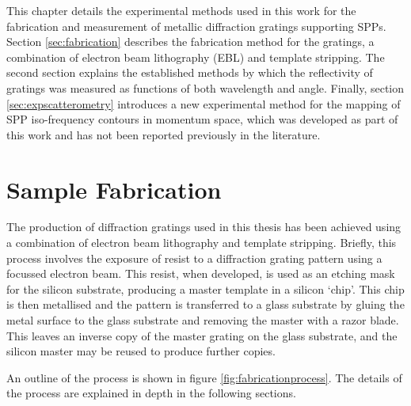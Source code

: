 

This chapter details the experimental methods used in this work for the fabrication and measurement of metallic diffraction gratings supporting SPPs. Section \ref{sec:fabrication} describes the fabrication method for the gratings, a combination of electron beam lithography (EBL) and template stripping. The second section explains the established methods by which the reflectivity of gratings was measured as functions of both wavelength and angle. Finally, section \ref{sec:expscatterometry} introduces a new experimental method for the mapping of SPP iso-frequency contours in momentum space, which was developed as part of this work and has not been reported previously in the literature. 

\section{Sample Fabrication\label{sec:fabrication}}

The production of diffraction gratings used in this thesis has been achieved using a combination of electron beam lithography and template stripping. Briefly, this process involves the exposure of resist to a diffraction grating pattern using a focussed electron beam. This resist, when developed, is used as an etching mask for the silicon substrate, producing a master template in a silicon `chip'.
This chip is then metallised and the pattern is transferred to a glass substrate by gluing the metal surface to the glass substrate and removing the master with a razor blade. This leaves an inverse copy of the master grating on the glass substrate, and the silicon master may be reused to produce further copies. 

An outline of the process is shown in figure \ref{fig:fabricationprocess}. The details of the process are explained in depth in the following sections. 

